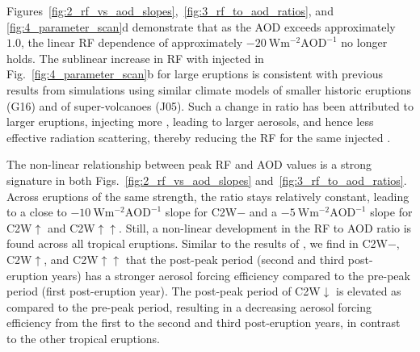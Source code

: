 \documentclass[draft]{agujournal2019}
\begin{document}
  Figures~\ref{fig:2_rf_vs_aod_slopes},~\ref{fig:3_rf_to_aod_ratios}, and
  \ref{fig:4_parameter_scan}d demonstrate that as the AOD exceeds approximately \(1.0\),
  the linear RF dependence of approximately
  \(\SI{-20}{\watt\metre^{-2}\mathrm{AOD}^{-1}}\) no longer holds. The sublinear
  increase in RF with injected  in Fig.~\ref{fig:4_parameter_scan}b for large
  eruptions is consistent with previous results from simulations using similar climate
  models of smaller historic eruptions (G16) and of super-volcanoes (J05). Such a change
  in ratio has been attributed to larger eruptions, injecting more , leading to
  larger aerosols, and hence less effective radiation scattering, thereby reducing the
  RF for the same injected  \cite{english2013, timmreck2010, timmreck2018}.

  The non-linear relationship between peak RF and AOD values is a strong signature in
  both Figs.~\ref{fig:2_rf_vs_aod_slopes} and~\ref{fig:3_rf_to_aod_ratios}. Across
  eruptions of the same strength, the ratio stays relatively constant, leading to a
  close to \(\SI{-10}{\watt\metre^{-2}\mathrm{AOD}^{-1}}\) slope for C2W\(-\) and a
  \(\SI{-5}{\watt\metre^{-2}\mathrm{AOD}^{-1}}\) slope for C2W\(\uparrow\) and
  C2W\(\uparrow\uparrow\). Still, a non-linear development in the RF to AOD ratio is
  found across all tropical eruptions. Similar to the results of ,
  we find in C2W\(-\), C2W\(\uparrow\), and C2W\(\uparrow\uparrow\) that the post-peak
  period (second and third post-eruption years) has a stronger aerosol forcing
  efficiency compared to the pre-peak period (first post-eruption year). The post-peak
  period of C2W\(\downarrow\) is elevated as compared to the pre-peak period, resulting
  in a decreasing aerosol forcing efficiency from the first to the second and third
  post-eruption years, in contrast to the other tropical eruptions.
\end{document}
